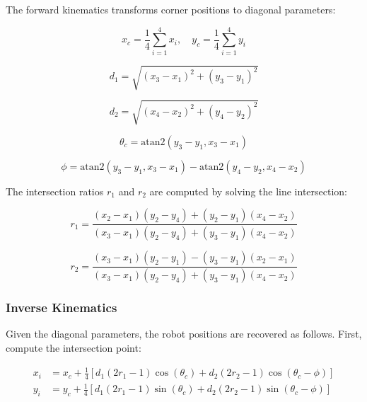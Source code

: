 \documentclass[lettersize,journal]{IEEEtran}
\begin{document}
The forward kinematics transforms corner positions to diagonal parameters:

\begin{equation}
x_c = \frac{1}{4}\sum_{i=1}^{4} x_i, \quad y_c = \frac{1}{4}\sum_{i=1}^{4} y_i
\end{equation}

\begin{equation}
d_1 = \sqrt{(x_3 - x_1)^2 + (y_3 - y_1)^2}
\end{equation}

\begin{equation}
d_2 = \sqrt{(x_4 - x_2)^2 + (y_4 - y_2)^2}
\end{equation}

\begin{equation}
\theta_c = \text{atan2}(y_3 - y_1, x_3 - x_1)
\end{equation}

\begin{equation}
\phi = \text{atan2}(y_3 - y_1, x_3 - x_1) - \text{atan2}(y_4 - y_2, x_4 - x_2)
\end{equation}

The intersection ratios $r_1$ and $r_2$ are computed by solving the line intersection:

\begin{equation}
r_1 = \frac{(x_2 - x_1)(y_2 - y_4) + (y_2 - y_1)(x_4 - x_2)}{(x_3 - x_1)(y_2 - y_4) + (y_3 - y_1)(x_4 - x_2)}
\end{equation}

\begin{equation}
r_2 = \frac{(x_3 - x_1)(y_2 - y_1) - (y_3 - y_1)(x_2 - x_1)}{(x_3 - x_1)(y_2 - y_4) + (y_3 - y_1)(x_4 - x_2)}
\end{equation}

\subsubsection{Inverse Kinematics}

Given the diagonal parameters, the robot positions are recovered as follows. First, compute the intersection point:

\begin{equation}
\begin{aligned}
x_i &= x_c + \frac{1}{4}\left[d_1(2r_1 - 1)\cos(\theta_c) + d_2(2r_2 - 1)\cos(\theta_c - \phi)\right] \\
y_i &= y_c + \frac{1}{4}\left[d_1(2r_1 - 1)\sin(\theta_c) + d_2(2r_2 - 1)\sin(\theta_c - \phi)\right]
\end{aligned}
\end{equation}
\end{document}

